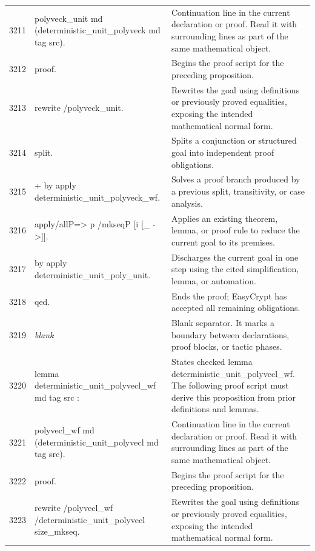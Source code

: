 \documentclass[10pt]{article}
\begin{document}
\begin{longtable}{r L{0.53\textwidth} L{0.37\textwidth}}
3211 & {\ttfamily\scriptsize   polyveck\_unit md (deterministic\_unit\_polyveck md tag src).} & Continuation line in the current declaration or proof.  Read it with surrounding lines as part of the same mathematical object. \\
3212 & {\ttfamily\scriptsize proof.} & Begins the proof script for the preceding proposition. \\
3213 & {\ttfamily\scriptsize rewrite /polyveck\_unit.} & Rewrites the goal using definitions or previously proved equalities, exposing the intended mathematical normal form. \\
3214 & {\ttfamily\scriptsize split.} & Splits a conjunction or structured goal into independent proof obligations. \\
3215 & {\ttfamily\scriptsize + by apply deterministic\_unit\_polyveck\_wf.} & Solves a proof branch produced by a previous split, transitivity, or case analysis. \\
3216 & {\ttfamily\scriptsize apply/allP=> p /mkseqP [i [\_ ->]].} & Applies an existing theorem, lemma, or proof rule to reduce the current goal to its premises. \\
3217 & {\ttfamily\scriptsize by apply deterministic\_unit\_poly\_unit.} & Discharges the current goal in one step using the cited simplification, lemma, or automation. \\
3218 & {\ttfamily\scriptsize qed.} & Ends the proof; EasyCrypt has accepted all remaining obligations. \\
3219 & {\ttfamily\scriptsize \emph{blank}} & Blank separator.  It marks a boundary between declarations, proof blocks, or tactic phases. \\
3220 & {\ttfamily\scriptsize lemma deterministic\_unit\_polyvecl\_wf md tag src :} & States checked lemma deterministic\_unit\_polyvecl\_wf.  The following proof script must derive this proposition from prior definitions and lemmas. \\
3221 & {\ttfamily\scriptsize   polyvecl\_wf md (deterministic\_unit\_polyvecl md tag src).} & Continuation line in the current declaration or proof.  Read it with surrounding lines as part of the same mathematical object. \\
3222 & {\ttfamily\scriptsize proof.} & Begins the proof script for the preceding proposition. \\
3223 & {\ttfamily\scriptsize rewrite /polyvecl\_wf /deterministic\_unit\_polyvecl size\_mkseq.} & Rewrites the goal using definitions or previously proved equalities, exposing the intended mathematical normal form. \\

\end{longtable}
\end{document}
